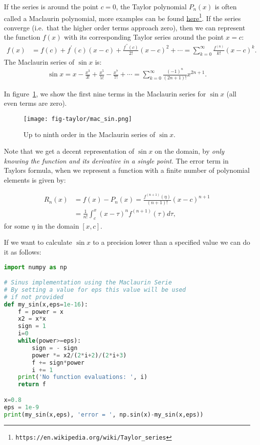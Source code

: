 \documentclass[graybox,sectrefs,envcountresetchap,open=right,final]{svmonodo}
\newenvironment{graybox2admon}[1][]{
\begin{graybox2mdframed}[frametitle=#1]
}
{
\end{graybox2mdframed}
}
\begin{document}
If the series is around the point $c=0$, the Taylor polynomial $P_n(x)$ is often called a Maclaurin polynomial, more examples can be found 
\href{{https://en.wikipedia.org/wiki/Taylor_series}}{here}\footnote{\texttt{https://en.wikipedia.org/wiki/Taylor\_series}}. If the series converge (i.e.~that the higher order terms approach zero), then we can represent the
function $f(x)$ with its corresponding Taylor series around the point $x=c$:
\begin{align}
 f(x) &= f(c)+f^\prime(c)(x-c)+\frac{f^{\prime\prime}(c)}{2!}(x-c)^2+\cdots
=\sum_{k=0}^\infty\frac{f^{(n)}}{k!}(x-c)^k.\label{eq:taylor:taylor}
\end{align}
The Maclaurin series of $\sin x$ is:
\begin{align}
\sin x = x-\frac{x^3}{3!}+\frac{x^5}{5!}-\frac{x^7}{7!}+\cdots=\sum_{k=0}^{\infty}\frac{(-1)^n}{(2n+1)!}x^{2n+1}.
\label{sin}
\end{align}

In figure~\ref{fig:mac_sin}, we show the first nine terms in the Maclaurin series for $\sin x$ (all even terms are zero). 

\begin{figure}[!ht]  %
  \centerline{\texttt{[image: fig-taylor/mac\_sin.png]}}
  \caption{
  Up to ninth order in the Maclaurin series of $\sin x$. \label{fig:mac_sin}
  }
\end{figure}

Note that we get a decent representation of $\sin x$ on the domain, by \emph{only knowing the function and its derivative in a single point}. 
The error term in Taylors formula, when we represent a function with a finite number of polynomial elements is given by:


\begin{graybox2admon}[Error term in Taylors formula:]
\begin{align}
R_n(x)&=f(x)-P_n(x)=\frac{f^{(n+1)}(\eta)}{(n+1)!}(x-c)^{n+1}\nonumber\\ 
      &=\frac{1}{n!}\int_c^x(x-\tau)^{n}f^{(n+1)}(\tau)d\tau,\label{eq:taylor:error}
\end{align}
for some $\eta$ in the domain $[x,c]$.
\end{graybox2admon}



If we want to calculate 
$\sin x$ to a precision lower than a specified value we can do it as follows:

\begin{lstlisting}[language=Python,style=blue1bar]
import numpy as np

# Sinus implementation using the Maclaurin Serie
# By setting a value for eps this value will be used
# if not provided
def my_sin(x,eps=1e-16):
    f = power = x
    x2 = x*x
    sign = 1
    i=0
    while(power>=eps):
        sign = - sign
        power *= x2/(2*i+2)/(2*i+3)
        f += sign*power
        i += 1
    print('No function evaluations: ', i)
    return f

x=0.8
eps = 1e-9
print(my_sin(x,eps), 'error = ', np.sin(x)-my_sin(x,eps))
\end{lstlisting}
\end{document}
